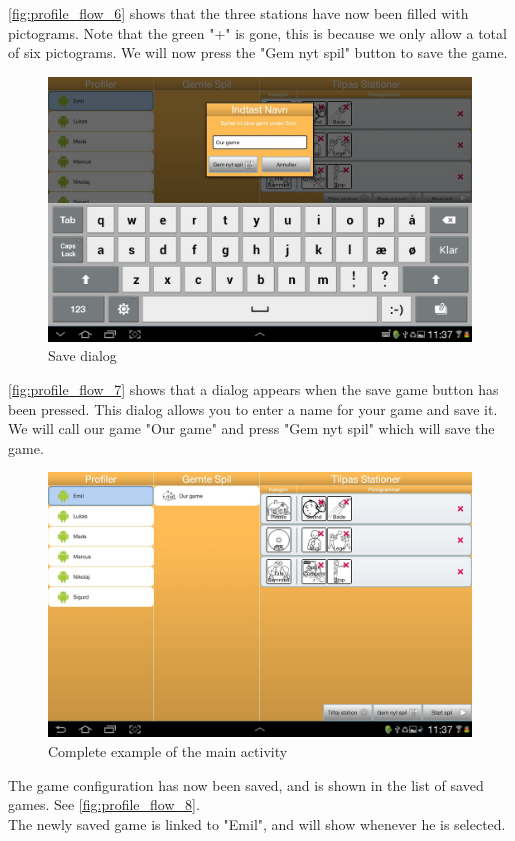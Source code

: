 \autoref{fig:profile_flow_6} shows that the three stations have now been filled with pictograms. Note that the green "+" is gone, this is because we only allow a total of six pictograms. We will now press the "Gem nyt spil" button to save the game.

\begin{figure}[H]
\centering
\includegraphics[width=0.9\linewidth]{img/screenshots/profile_flow_7.jpg}%
\caption{Save dialog}
\label{fig:profile_flow_7}
\end{figure}

\autoref{fig:profile_flow_7} shows that a dialog appears when the save game button has been pressed. This dialog allows you to enter a name for your game and save it. We will call our game "Our game" and press "Gem nyt spil" which will save the game.

\begin{figure}[H]
\centering
\includegraphics[width=0.9\linewidth]{img/screenshots/profile_flow_8.jpg}%
\caption{Complete example of the main activity}
\label{fig:profile_flow_8}
\end{figure}

The game configuration has now been saved, and is shown in the list of saved games. See \autoref{fig:profile_flow_8}.\\
The newly saved game is linked to "Emil", and will show whenever he is selected.
